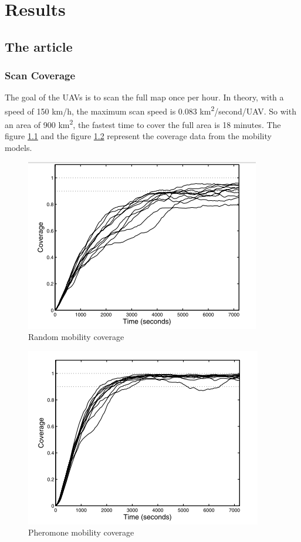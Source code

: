 \chapter{Results}

\section{The article}

\subsection{Scan Coverage}

The goal of the UAVs is to scan the full map once per hour. In theory, with a speed of 150 km/h, the maximum scan speed is 0.083 km\textsuperscript{2}/second/UAV. So with an area of 900 km\textsuperscript{2}, the fastest time to cover the full area is 18 minutes. The figure \ref{randomcoverage} and the figure \ref{pheromonecoverage} represent the coverage data from the mobility models.

\begin{figure}[h]
\caption{\label{randomcoverage} Random mobility coverage}
   \includegraphics{../images/random_coverage.png}
\end{figure}

\newpage

\begin{figure}[!h]
\caption{\label{pheromonecoverage} Pheromone mobility coverage}
   \includegraphics{../images/pheromone_coverage.png}
\end{figure}

